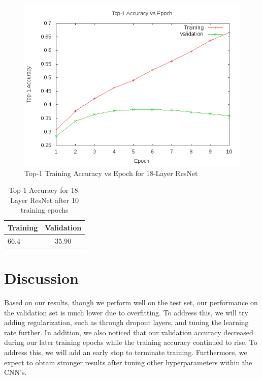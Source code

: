 \documentclass[10pt,twocolumn,letterpaper]{article}
\begin{document}
\begin{figure}[t]
\begin{center}
  \includegraphics[width=0.8\linewidth]{accuracy_resnet18}
\end{center}
   \caption{Top-1 Training Accuracy vs Epoch for 18-Layer ResNet}
\label{fig:top1-resnet18}
\end{figure}

\begin{table}
\begin{center}
\begin{tabular}{|l|c|}
\hline
Training & Validation \\
\hline\hline
$66.4$ & $35.90$\\
\hline
\end{tabular}
\end{center}
\caption{Top-1 Accuracy for 18-Layer ResNet after 10 training epochs}
\label{table:acc18}
\end{table}

\section{Discussion}

Based on our results, though we perform well on the test set, our performance
on the validation set is much lower due to overfitting. To address this, we
will try adding regularization, such as through dropout layers, and tuning the
learning rate further. In addition, we also noticed that
our validation accuracy decreased during our later training epochs while the
training accuracy continued to rise. To address this, we will add an early stop
to terminate training. Furthermore, we expect to obtain stronger results after
tuning other hyperparameters within the CNN's.\\
\end{document}
